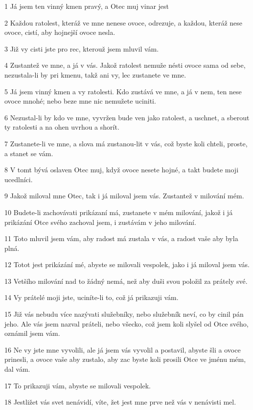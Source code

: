 \par 1 Já jsem ten vinný kmen pravý, a Otec muj vinar jest
\par 2 Každou ratolest, kteráž ve mne nenese ovoce, odrezuje, a každou, kteráž nese ovoce, cistí, aby hojnejší ovoce nesla.
\par 3 Již vy cisti jste pro rec, kterouž jsem mluvil vám.
\par 4 Zustantež ve mne, a já v vás. Jakož ratolest nemuže nésti ovoce sama od sebe, nezustala-li by pri kmenu, takž ani vy, lec zustanete ve mne.
\par 5 Já jsem vinný kmen a vy ratolesti. Kdo zustává ve mne, a já v nem, ten nese ovoce mnohé; nebo beze mne nic nemužete uciniti.
\par 6 Nezustal-li by kdo ve mne, vyvržen bude ven jako ratolest, a uschnet, a sberout ty ratolesti a na ohen uvrhou a shorít.
\par 7 Zustanete-li ve mne, a slova má zustanou-lit v vás, což byste koli chteli, proste, a stanet se vám.
\par 8 V tomt bývá oslaven Otec muj, když ovoce nesete hojné, a takt budete moji ucedlníci.
\par 9 Jakož miloval mne Otec, tak i já miloval jsem vás. Zustantež v milování mém.
\par 10 Budete-li zachovávati prikázaní má, zustanete v mém milování, jakož i já prikázání Otce svého zachoval jsem, i zustávám v jeho milování.
\par 11 Toto mluvil jsem vám, aby radost má zustala v vás, a radost vaše aby byla plná.
\par 12 Totot jest prikázání mé, abyste se milovali vespolek, jako i já miloval jsem vás.
\par 13 Vetšího milování nad to žádný nemá, než aby duši svou položil za prátely své.
\par 14 Vy prátelé moji jste, uciníte-li to, což já prikazuji vám.
\par 15 Již vás nebudu více nazývati služebníky, nebo služebník neví, co by cinil pán jeho. Ale vás jsem nazval práteli, nebo všecko, což jsem koli slyšel od Otce svého, oznámil jsem vám.
\par 16 Ne vy jste mne vyvolili, ale já jsem vás vyvolil a postavil, abyste šli a ovoce prinesli, a ovoce vaše aby zustalo, aby zac byste koli prosili Otce ve jménu mém, dal vám.
\par 17 To prikazuji vám, abyste se milovali vespolek.
\par 18 Jestližet vás svet nenávidí, víte, žet jest mne prve než vás v nenávisti mel.
